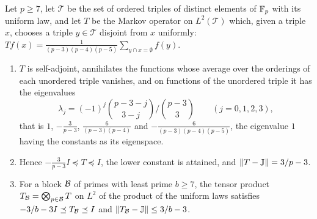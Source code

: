 \begin{lemma}\label{sec:frontier:empty-triple-negative}
Let $p\ge7$, let $\mathcal T$ be the set of ordered triples of distinct elements
of $\mathbb F_p$ with its uniform law, and let $T$ be the Markov operator on
$L^2(\mathcal T)$ which, given a triple $x$, chooses a triple $y\in\mathcal T$
disjoint from $x$ uniformly:
$Tf(x)=\frac1{(p-3)(p-4)(p-5)}\sum_{y\cap x=\emptyset}f(y)$.
\begin{enumerate}[label=\textup{(\alph*)}]
\item\label{it:triple:spec} $T$ is self-adjoint, annihilates the functions whose
 average over the orderings of each unordered triple vanishes, and on functions
 of the unordered triple it has the eigenvalues
 \begin{equation}\label{eq:triple:spectrum}
  \lambda_j=(-1)^j\binom{p-3-j}{3-j}\Big/\binom{p-3}3\qquad(j=0,1,2,3),
 \end{equation}
 that is $1$, $-\frac3{p-3}$, $\frac6{(p-3)(p-4)}$ and
 $-\frac6{(p-3)(p-4)(p-5)}$, the eigenvalue $1$ having the constants as its
 eigenspace.
\item\label{it:triple:bound} Hence $-\frac3{p-3}I\preceq T\preceq I$, the lower constant
 is attained, and $\|T-\mathbb J\|=3/p-3$.
\item\label{it:triple:block} For a block $\mathcal B$ of primes with least prime $b\ge7$, the
 tensor product $T_{\mathcal B}=\bigotimes_{p\in\mathcal B}T$ on $L^2$ of the product of the
 uniform laws satisfies $-3/b-3I\preceq T_{\mathcal B}\preceq I$ and
 $\|T_{\mathcal B}-\mathbb J\|\le3/b-3$.
\end{enumerate}
\end{lemma}

